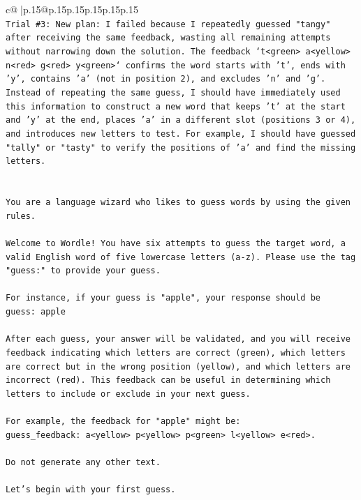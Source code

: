 \documentclass{article}
\begin{document}
{\begin{supertabular}{c@{$\;$}|p{.15\linewidth}@{}p{.15\linewidth}p{.15\linewidth}p{.15\linewidth}p{.15\linewidth}p{.15\linewidth}}
{{{\\ 
\texttt{Trial \#3: New plan: I failed because I repeatedly guessed "tangy" after receiving the same feedback, wasting all remaining attempts without narrowing down the solution. The feedback `t<green> a<yellow> n<red> g<red> y<green>` confirms the word starts with 't', ends with 'y', contains 'a' (not in position 2), and excludes 'n' and 'g'. Instead of repeating the same guess, I should have immediately used this information to construct a new word that keeps 't' at the start and 'y' at the end, places 'a' in a different slot (positions 3 or 4), and introduces new letters to test. For example, I should have guessed "tally" or "tasty" to verify the positions of 'a' and find the missing letters.} \\
\\ 
\\ 
\texttt{You are a language wizard who likes to guess words by using the given rules.} \\
\\ 
\texttt{Welcome to Wordle! You have six attempts to guess the target word, a valid English word of five lowercase letters (a{-}z). Please use the tag "guess:" to provide your guess.} \\
\\ 
\texttt{For instance, if your guess is "apple", your response should be} \\
\texttt{guess: apple} \\
\\ 
\texttt{After each guess, your answer will be validated, and you will receive feedback indicating which letters are correct (green), which letters are correct but in the wrong position (yellow), and which letters are incorrect (red). This feedback can be useful in determining which letters to include or exclude in your next guess.} \\
\\ 
\texttt{For example, the feedback for "apple" might be:} \\
\texttt{guess\_feedback: a<yellow> p<yellow> p<green> l<yellow> e<red>.} \\
\\ 
\texttt{Do not generate any other text.} \\
\\ 
\texttt{Let's begin with your first guess.} \\
            }
        }
    }
     \\ \\


\end{supertabular}}
\end{document}

